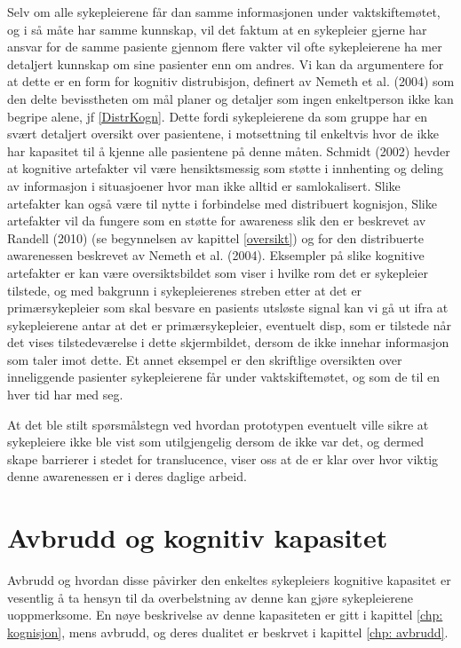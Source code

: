\noindent
Selv om alle sykepleierene får dan samme informasjonen under vaktskiftemøtet, og i så måte har samme kunnskap, vil det faktum at en sykepleier gjerne har ansvar for de samme pasiente gjennom flere vakter vil ofte sykepleierene ha mer detaljert kunnskap om sine pasienter enn om andres. Vi kan da argumentere for at dette er en form for kognitiv distrubisjon, definert av Nemeth et al. (2004) som den delte bevisstheten om mål planer og detaljer som ingen enkeltperson ikke kan begripe alene, jf \ref{DistrKogn}. Dette fordi sykepleierene da som gruppe har en svært detaljert oversikt over pasientene, i motsettning til enkeltvis hvor de ikke har kapasitet til å kjenne alle pasientene på denne måten. 
Schmidt (2002) hevder at kognitive artefakter vil være hensiktsmessig som støtte i innhenting og deling av informasjon i situasjoener hvor man ikke alltid er samlokalisert. Slike artefakter kan også være til nytte i forbindelse med distribuert kognisjon, 
Slike artefakter vil da fungere som en støtte for awareness slik den er beskrevet av Randell (2010) (se begynnelsen av kapittel \ref{oversikt}) og for den distribuerte awarenessen beskrevet av Nemeth et al. (2004).
Eksempler på slike kognitive artefakter er kan være oversiktsbildet som viser i hvilke rom det er sykepleier tilstede, og med bakgrunn i sykepleierenes streben etter at det er primærsykepleier som skal besvare en pasients utsløste signal kan vi gå ut ifra at sykepleierene antar at det er primærsykepleier, eventuelt disp, som er tilstede når det vises tilstedeværelse i dette skjermbildet, dersom de ikke innehar informasjon som taler imot dette. Et annet eksempel er den skriftlige oversikten over inneliggende pasienter sykepleierene får under vaktskiftemøtet, og som de til en hver tid har med seg.

\noindent
At det ble stilt spørsmålstegn ved hvordan prototypen eventuelt ville sikre at sykepleiere ikke ble vist som utilgjengelig dersom de ikke var det, og dermed skape barrierer i stedet for translucence, viser oss at de er klar over hvor viktig denne awarenessen er i deres daglige arbeid. 


\section{Avbrudd og kognitiv kapasitet}
Avbrudd og hvordan disse påvirker den enkeltes sykepleiers kognitive kapasitet er vesentlig å ta hensyn til da overbelstning av denne kan gjøre sykepleierene uoppmerksome. En nøye beskrivelse av denne kapasiteten er gitt i kapittel \ref{chp: kognisjon}, mens avbrudd, og deres dualitet er beskrvet i kapittel \ref{chp: avbrudd}. 

